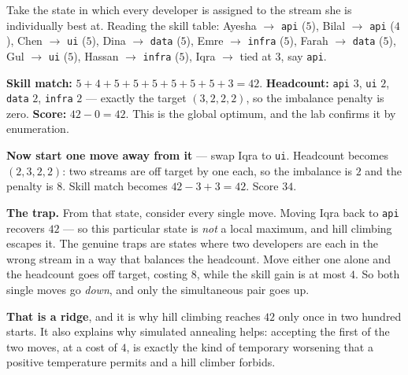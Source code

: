 \begin{worked}
Take the state in which every developer is assigned to the stream she is
individually best at. Reading the skill table: Ayesha $\to$ \texttt{api} ($5$),
Bilal $\to$ \texttt{api} ($4$), Chen $\to$ \texttt{ui} ($5$), Dina $\to$
\texttt{data} ($5$), Emre $\to$ \texttt{infra} ($5$), Farah $\to$ \texttt{data}
($5$), Gul $\to$ \texttt{ui} ($5$), Hassan $\to$ \texttt{infra} ($5$), Iqra $\to$
tied at $3$, say \texttt{api}.

\smallskip
\textbf{Skill match:} $5+4+5+5+5+5+5+5+3 = 42$.
\textbf{Headcount:} \texttt{api} $3$, \texttt{ui} $2$, \texttt{data} $2$,
\texttt{infra} $2$ --- exactly the target $(3,2,2,2)$, so the imbalance penalty is
zero.
\textbf{Score:} $42 - 0 = 42$. This is the global optimum, and the lab confirms it
by enumeration.

\smallskip
\textbf{Now start one move away from it} --- swap Iqra to \texttt{ui}. Headcount
becomes $(2,3,2,2)$: two streams are off target by one each, so the imbalance is
$2$ and the penalty is $8$. Skill match becomes $42-3+3 = 42$. Score $34$.

\smallskip
\textbf{The trap.} From that state, consider every single move. Moving Iqra back to
\texttt{api} recovers $42$ --- so this particular state is \emph{not} a local
maximum, and hill climbing escapes it. The genuine traps are states where two
developers are each in the wrong stream in a way that balances the headcount. Move
either one alone and the headcount goes off target, costing $8$, while the skill
gain is at most $4$. So both single moves go \emph{down}, and only the simultaneous
pair goes up.

\smallskip
\textbf{That is a ridge}, and it is why hill climbing reaches $42$ only once in two
hundred starts. It also explains why simulated annealing helps: accepting the first
of the two moves, at a cost of $4$, is exactly the kind of temporary worsening that
a positive temperature permits and a hill climber forbids.
\end{worked}

